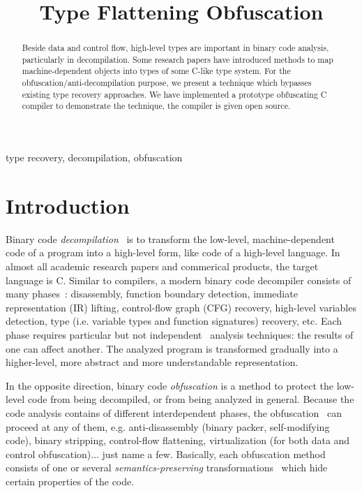 \documentclass[compsoc,conference,a4paper,10pt,times]{IEEEtran}
\begin{document}
\title{Type Flattening Obfuscation}

\author{
}

\maketitle

\begin{abstract}
  Beside data and control flow, high-level types are important in binary code analysis, particularly in
  decompilation. Some research papers have introduced methods to map machine-dependent objects into types
  of some C-like type system. For the obfuscation/anti-decompilation purpose, we
  present a technique which bypasses existing type recovery approaches. We have implemented a
  prototype obfuscating C compiler to demonstrate the technique, the compiler is
  given open source.
\end{abstract}

\begin{IEEEkeywords}
type recovery, decompilation, obfuscation
\end{IEEEkeywords}

\section{Introduction}
\noindent
Binary code \emph{decompilation}~\cite{cifuentes_reverse_1994} is to transform the low-level,
machine-dependent code of a program into a high-level form, like code of a high-level language.
In almost all academic research papers and commerical products, the target language is C.
Similar to compilers, a modern binary code decompiler consists of many
phases~\cite{cifuentes_reverse_1994,van_emmerik_static_2007}: disassembly, function boundary detection, immediate
representation (IR) lifting, control-flow graph (CFG) recovery, high-level variables detection,
type (i.e. variable types and function signatures) recovery, etc. Each phase requires
particular but not independent~\cite{schwarz_disassembly_2002} analysis techniques: the results of
one can affect another. The analyzed program is
transformed gradually into a higher-level, more abstract and more understandable representation.

In the opposite direction, binary code \emph{obfuscation} is a method to protect the low-level code from
being decompiled, or from being analyzed in general. Because the code analysis contains of different
interdependent phases, the obfuscation~\cite{banescu_tutorial_2018,collberg_surreptitious_2009}
can proceed at any of them, e.g. anti-disassembly
(binary packer, self-modifying code), binary stripping, control-flow flattening, virtualization (for both
data and control obfuscation)... just name a few. Basically, each obfuscation method consists of one or
several \emph{semantics-preserving} transformations~\cite{collberg_surreptitious_2009,dalla_preda_semantic-based_2005}
which hide certain properties of the code.
\end{document}
